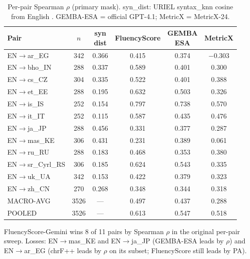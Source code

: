 \documentclass[11pt]{article}
\newcommand{\FS}{FluencyScore}
\begin{document}
\begin{table}[t]
\centering
\scriptsize
\setlength{\tabcolsep}{2pt}

\caption{Per-pair Spearman $\rho$ (primary mask). syn\_dist: URIEL syntax\_knn cosine from English \cite{littell-etal-2017-uriel}. GEMBA-ESA = official GPT-4.1; MetricX = MetricX-24.}
\label{tab:1c}
\begin{tabularx}{\columnwidth}{>{\raggedright\arraybackslash}Xccccc}
\toprule
Pair & $n$ & \shortstack{syn\\dist} & \FS{} & \shortstack{GEMBA\\ESA} & MetricX \\
\midrule
EN$\to$ar\_EG & 342 & 0.366 & 0.415 & 0.374 & $-0.303$ \\
EN$\to$bho\_IN & 288 & 0.337 & 0.589 & 0.401 & 0.300 \\
EN$\to$cs\_CZ & 304 & 0.335 & 0.522 & 0.401 & 0.388 \\
EN$\to$et\_EE & 288 & 0.195 & 0.632 & 0.503 & 0.326 \\
EN$\to$is\_IS & 252 & 0.154 & 0.797 & 0.738 & 0.570 \\
EN$\to$it\_IT & 252 & 0.115 & 0.587 & 0.435 & 0.476 \\
EN$\to$ja\_JP & 288 & 0.456 & 0.331 & 0.377 & 0.287 \\
EN$\to$mas\_KE & 306 & 0.431 & 0.231 & 0.389 & 0.061 \\
EN$\to$ru\_RU & 288 & 0.183 & 0.468 & 0.353 & 0.380 \\
EN$\to$sr\_Cyrl\allowbreak\_RS & 306 & 0.185 & 0.624 & 0.543 & 0.335 \\
EN$\to$uk\_UA & 342 & 0.153 & 0.422 & 0.379 & 0.323 \\
EN$\to$zh\_CN & 270 & 0.268 & 0.348 & 0.344 & 0.318 \\
MACRO-AVG & 3526 & --- & 0.497 & 0.437 & 0.288 \\
POOLED & 3526 & --- & 0.613 & 0.547 & 0.518 \\
\bottomrule
\end{tabularx}

\end{table}


\FS{}-Gemini wins 8 of 11 pairs by Spearman $\rho$ in the original per-pair sweep.
Losses: EN$\to$mas\_KE and EN$\to$ja\_JP (GEMBA-ESA leads by $\rho$) and
EN$\to$ar\_EG (chrF++ leads by $\rho$ on its subset; \FS{} still leads by PA).
\end{document}
